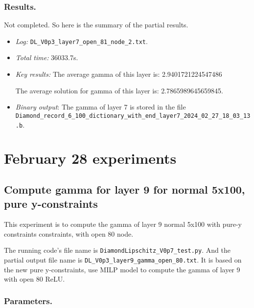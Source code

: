 \documentclass{llncs}
\begin{document}
\subsubsection*{Results.}

Not completed. So here is the summary of the partial results.

\begin{itemize}
	\item \emph{Log:} \verb*|DL_V0p3_layer7_open_81_node_2.txt|.
	
	\item \emph{Total time:} 36033.7s.
	
	\item \emph{Key results:}  The average gamma of this layer is:  2.9401721224547486
	
	The average solution for gamma of this layer is:  2.7865989645659845.
	
	\item  \emph{Binary output}: The gamma of layer 7 is stored in the file \verb*|Diamond_record_6_100_dictionary_with_end_layer7_2024_02_27_18_03_13.b|.
	
\end{itemize}

\section{February 28 experiments}

\subsection{Compute gamma for layer 9 for normal 5x100, pure y-constraints}

This experiment is to compute the gamma of layer 9 normal 5x100 with pure-y constraints constraints, with open 80 node.

\vspace*{1ex}

The running code's file name is \verb*|DiamondLipschitz_V0p7_test.py|. And the partial output file name is \verb*|DL_V0p3_layer9_gamma_open_80.txt|.  It is based on the new pure y-constraints, use MILP model to compute the gamma of layer 9 with open 80 ReLU.

\subsubsection*{Parameters.}
\end{document}
